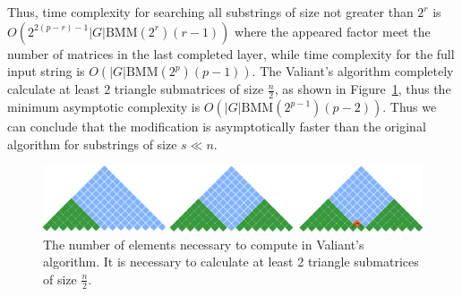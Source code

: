 Thus, time complexity for searching all substrings of size not greater than $2^{r}$ is $O(2^{2(p - r) - 1}|G|\mathrm{BMM}(2^{r})(r - 1))$ where the appeared factor meet the number of matrices in the last completed layer, while time complexity for the full input string is $O(|G|\mathrm{BMM}(2^p)(p - 1))$. 
The Valiant's algorithm completely calculate at least 2 triangle submatrices of size $\frac{n}{2}$, as shown in Figure~\ref{fig5}, thus the minimum asymptotic complexity is $O(|G|\mathrm{BMM}(2^{p - 1})(p - 2))$.
Thus we can conclude that the modification is asymptotically faster than the original algorithm for substrings of size $s \ll n$.

\begin{figure}
\vspace{3mm}
 \begin{center}
 \includegraphics[width=12cm]{pictures/valsubstring.pdf}
    \caption{The number of elements necessary to compute in Valiant's algorithm. It is necessary to calculate at least 2 triangle submatrices of size $\frac{n}{2}$.}
    \label{fig5}
 \end{center}
\vspace{-8mm}
\end{figure}

